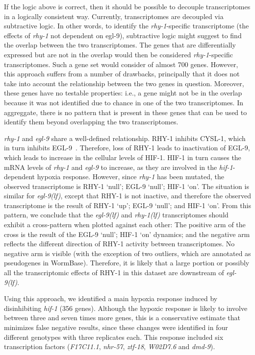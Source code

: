 \documentclass[9pt,twocolumn,twoside]{pnas-new}
\newcommand{\gene}[1]{\emph{#1}}
\newcommand{\nhr}{\emph{nhr-57}}
\newcommand{\egl}{\emph{egl-9(lf)}}
\newcommand{\rhy}{\emph{rhy-1(lf)}}
\newcommand{\eglp}{EGL-9}
\newcommand{\rhyp}{RHY-1}
\newcommand{\hifp}{HIF-1}
\newcommand{\cyslp}{CYSL-1}
\begin{document}
If the logic above is correct, then it should be possible to decouple
transcriptomes in a logically consistent way. Currently, transcriptomes are
decoupled via subtractive logic. In other words, to identify the
\gene{rhy-1}-specific
transcriptome (the effects of \gene{rhy-1} not dependent on \gene{}egl-9),
subtractive logic
might suggest to find the overlap between the two transcriptomes. The genes that
are differentially expressed but are not in the overlap would then be considered
\gene{rhy-1}-specific transcriptomes. Such a gene set would consider of almost
700 genes. However, this approach suffers from a number of
drawbacks, principally that it does not take into account the relationship
between the two genes in question. Moreover, these genes have no testable properties:
i.e., a gene might not be in the overlap because it was not identified due to
chance in one of the two transcriptomes. In aggreggate, there is no pattern that
is present in these genes that can be used to identify them beyond overlapping
the two transcriptomes.

\gene{rhy-1} and \gene{egl-9} share a well-defined relationship. \rhyp{}
inhibits \cyslp{},
which in turn inhibits \eglp{}~\cite{Ma2012}. Therefore, loss of \rhyp{} leads
to inactivation of \eglp{}, which leads to increase in the cellular levels of
\hifp{}. \hifp{} in turn causes the mRNA levels of \gene{rhy-1} and \gene{egl-9}
to increase,
as they are involved in the \gene{hif-1}-dependent hypoxia response. However, since
\gene{rhy-1} has been mutated, the observed transcriptome is
\rhyp{} `null'; \eglp{} `null'; \hifp{} `on'. The situation is similar for
\egl{}, except that \rhyp{}
is not inactive, and therefore the observed transcriptome is the result of
\rhyp{} `up'; \eglp{} `null'; and \hifp{} `on'. From this pattern, we conclude that
the \egl{} and \rhy{} transcriptomes should exhibit a cross-pattern when plotted
against each other: The positive
arm of the cross is the result of the \eglp{} `null'; \hifp{} `on' dynamics; and the
negative arm reflects the different direction of \rhyp{} activity between
transcriptomes. No negative arm is visible (with the exception of two
outliers, which are annotated as pseudogenes in WormBase). Therefore, it is likely
that a large portion or possibly all the transcriptomic effects of \rhyp{} in
this dataset are downstream of \egl{}.

Using this approach, we identified a main hypoxia response induced by disinhibiting
\gene{hif-1} (356 genes). Although the hypoxic response is likely
to involve between three and seven times more genes, this is a conservative
estimate that minimizes false negative results, since these changes were
identified in four different genotypes with three replicates each. This response
included six transcription factors (\emph{F17C11.1}, \nhr{}, \gene{ztf-18},
\gene{W02D7.6} and \gene{dmd-9}).
\end{document}
